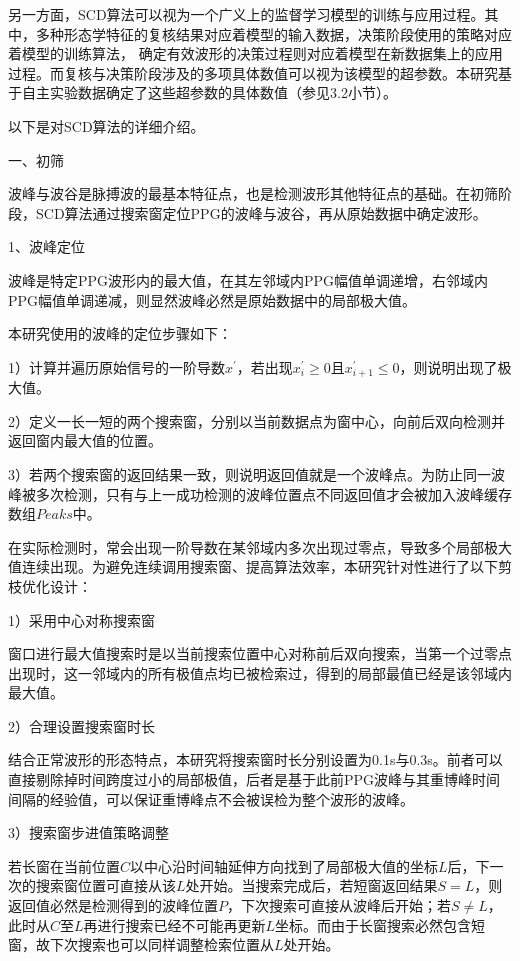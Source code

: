 另一方面，SCD算法可以视为一个广义上的监督学习模型的训练与应用过程\cite{Zhou2016}。其中，多种形态学特征的复核结果对应着模型的输入数据，决策阶段使用的策略对应着模型的训练算法，
确定有效波形的决策过程则对应着模型在新数据集上的应用过程。而复核与决策阶段涉及的多项具体数值可以视为该模型的超参数。本研究基于自主实验数据确定了这些超参数的具体数值（参见3.2小节）。

以下是对SCD算法的详细介绍。

一、初筛

波峰与波谷是脉搏波的最基本特征点，也是检测波形其他特征点的基础。在初筛阶段，SCD算法通过搜索窗定位PPG的波峰与波谷，再从原始数据中确定波形。

1、波峰定位

波峰是特定PPG波形内的最大值，在其左邻域内PPG幅值单调递增，右邻域内PPG幅值单调递减，则显然波峰必然是原始数据中的局部极大值。

本研究使用的波峰的定位步骤如下：

1）计算并遍历原始信号的一阶导数$x^{'}$，若出现$x_i^{'}\ge 0$且$x_{i+1}^{'}\le 0$，则说明出现了极大值。

2）定义一长一短的两个搜索窗，分别以当前数据点为窗中心，向前后双向检测并返回窗内最大值的位置。

3）若两个搜索窗的返回结果一致，则说明返回值就是一个波峰点。为防止同一波峰被多次检测，只有与上一成功检测的波峰位置点不同返回值才会被加入波峰缓存数组$Peaks$中。

在实际检测时，常会出现一阶导数在某邻域内多次出现过零点，导致多个局部极大值连续出现。为避免连续调用搜索窗、提高算法效率，本研究针对性进行了以下剪枝优化设计：

1）采用中心对称搜索窗

窗口进行最大值搜索时是以当前搜索位置中心对称前后双向搜索，当第一个过零点出现时，这一邻域内的所有极值点均已被检索过，得到的局部最值已经是该邻域内最大值。

2）合理设置搜索窗时长

结合正常波形的形态特点，本研究将搜索窗时长分别设置为0.1s与0.3s。前者可以直接剔除掉时间跨度过小的局部极值，后者是基于此前PPG波峰与其重博峰时间间隔的经验值，可以保证重博峰点不会被误检为整个波形的波峰。

3）搜索窗步进值策略调整

若长窗在当前位置$C$以中心沿时间轴延伸方向找到了局部极大值的坐标$L$后，下一次的搜索窗位置可直接从该$L$处开始。当搜索完成后，若短窗返回结果$S=L$，则返回值必然是检测得到的波峰位置$P$，下次搜索可直接从波峰后开始；若$S\ne L$，
此时从$C$至$L$再进行搜索已经不可能再更新$L$坐标。而由于长窗搜索必然包含短窗，故下次搜索也可以同样调整检索位置从$L$处开始。

